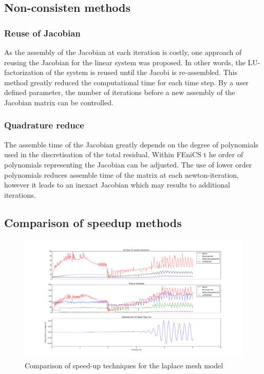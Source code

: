 \subsection{Non-consisten methods}    
\subsubsection{Reuse of Jacobian}
As the assembly of the Jacobian at each iteration is costly, one approach of reusing the Jacobian for the linear system was proposed. In other words, the LU-factorization of the system is reused until the Jacobi is re-assembled. This method greatly reduced the computational time for each time step. By a user defined parameter, the number of iterations before a new assembly of the Jacobian matrix can be controlled. 

\subsubsection{Quadrature reduce}
The assemble time of the Jacobian greatly depends on the degree of polynomials used in the discretisation of the total residual. Within FEniCS t he order of polynomials representing the Jacobian can be adjusted. The use of lower order polynomials reduces assemble time of the matrix at each newton-iteration, however it leads to an inexact Jacobian which may results to additional iterations. 


\subsection{Comparison of speedup methods}

\begin{figure}[h!]
 \includegraphics[scale=0.36]{./Fig/itercompare.png}
 \caption{Comparison of speed-up techniques for the laplace mesh model}
\end{figure}

